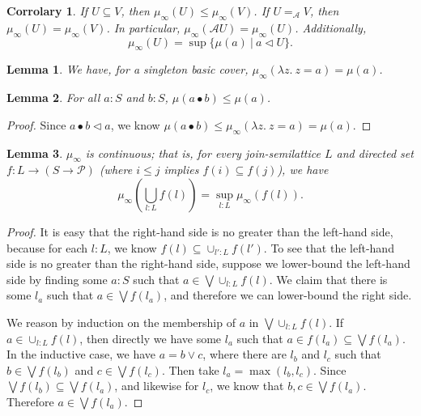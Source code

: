 \documentclass{article}           %
\newtheorem{lemma}{Lemma}
\newtheorem{corrolary}{Corrolary}
\newcommand{\cov}{\vartriangleleft}
\newcommand{\Prop}{\mathcal{P}}
\newcommand{\fun}[2]{\lambda {#1}.\  {#2}}
\newcommand{\suchthat}{\ |\ }
\begin{document}
\begin{corrolary}
If $U \subseteq V$, then $\mu_\infty(U) \le \mu_\infty(V)$. If $U =_\mathcal{A} V$, then $\mu_\infty(U) = \mu_\infty(V)$. In particular, $\mu_\infty(\mathcal{A}U) = \mu_\infty(U)$. Additionally,
\[
\mu_\infty(U) = \sup \{\mu(a) \suchthat a \cov U \}.
\]
\end{corrolary}

\begin{lemma}
We have, for a singleton basic cover, $\mu_\infty(\fun{z}{z = a}) = \mu(a)$.
\end{lemma}

\begin{lemma}
For all $a : S$ and $b : S$, $\mu(a \bullet b) \le \mu(a)$.
\end{lemma}
\begin{proof}
Since $a \bullet b \cov a$, we know $\mu(a \bullet b) \le \mu_\infty(\fun{z}{z = a}) = \mu(a)$.
\end{proof}

\begin{lemma}
$\mu_\infty$ is continuous; that is, for every join-semilattice $L$ and directed set $f : L \to (S \to \Prop)$ (where $i \le j$ implies $f(i) \subseteq f(j)$), we have
\[
\mu_\infty\left(\bigcup_{l : L} f(l)\right) = \sup_{l : L} \mu_\infty(f(l)).
\]
\end{lemma}
\begin{proof}
It is easy that the right-hand side is no greater than the left-hand side, because for each $l : L$, we know $f(l) \subseteq \cup_{l' : L} f(l')$. To see that the left-hand side is no greater than the right-hand side, suppose we lower-bound the left-hand side by finding some $a : S$ such that $a \in \bigvee \cup_{l : L} f(l)$. We claim that there is some $l_a$ such that $a \in \bigvee f(l_a)$, and therefore we can lower-bound the right side. 

We reason by induction on the membership of $a$ in $\bigvee \cup_{l : L} f(l)$. If $a \in \cup_{l : L} f(l)$, then directly we have some $l_a$ such that $a \in f(l_a) \subseteq \bigvee f(l_a)$. In the inductive case, we have $a = b \vee c$, where there are $l_b$ and $l_c$ such that $b \in \bigvee f(l_b)$ and $c \in \bigvee f(l_c)$. Then take $l_a = \max(l_b, l_c)$. Since $\bigvee f(l_b) \subseteq \bigvee f(l_a)$, and likewise for $l_c$, we know that $b, c \in \bigvee f(l_a)$. Therefore $a \in \bigvee f(l_a)$.
\end{proof}
\end{document}
